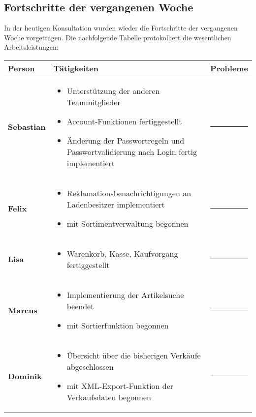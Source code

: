 \documentclass{scrartcl}
\begin{document}
\subsection{Fortschritte der vergangenen Woche}
In der heutigen Konsultation wurden wieder die Fortschritte der vergangenen Woche vorgetragen. Die nachfolgende Tabelle protokolliert die wesentlichen Arbeitsleistungen:\\[.4cm]
\renewcommand{\arraystretch}{2}
\begin{tabularx}{\textwidth}{p{}p{}X}
\hline
\textsf{\textbf{\large Person}} & \textsf{\textbf{\large Tätigkeiten}} & \textsf{\textbf{\large Probleme}} \\
\hline\hline
\textbf{Sebastian} & 
 \begin{itemize}
 \item Unterstützung der anderen Teammitglieder
 \item Account-Funktionen fertiggestellt
 \item Änderung der Passwortregeln und Passwortvalidierung nach Login fertig implementiert
 \end{itemize}
 & \rule[1ex]{.7cm}{1pt} \\ \hline
\textbf{Felix} & 
 \begin{itemize}
 \item Reklamationsbenachrichtigungen an Ladenbesitzer implementiert
 \item mit Sortimentverwaltung begonnen
 \end{itemize}
 & \rule[1ex]{.7cm}{1pt} \\ \hline
\textbf{Lisa} & 
 \begin{itemize}
 \item Warenkorb, Kasse, Kaufvorgang fertiggestellt
 \end{itemize}
& \rule[1ex]{.7cm}{1pt} \\ \hline
\textbf{Marcus} & 
 \begin{itemize}
 \item Implementierung der Artikelsuche beendet
 \item mit Sortierfunktion begonnen
 \end{itemize}
& \rule[1ex]{.7cm}{1pt} \\ \hline
\textbf{Dominik} &
 \begin{itemize}
 \item Übersicht über die bisherigen Verkäufe abgeschlossen
 \item mit XML-Export-Funktion der Verkaufsdaten begonnen
 \end{itemize}
& \rule[1ex]{.7cm}{1pt} \\ \hline
\end{tabularx}\\
\end{document}
